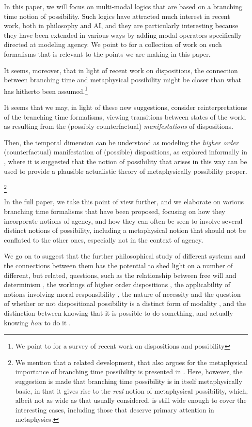\documentclass{article}
\begin{document}
In this paper, we will focus on multi-modal logics that are based on a branching time notion of possibility. Such logics have attracted much interest in recent work, both in philosophy and AI, and they are particularly interesting because they have been extended in various ways by adding modal operators specifically directed at modeling agency. We point to \cite{stit,dstit,atl,atle,nctl,stitstart} for a collection of work on such formalisms that is relevant to the points we are making in this paper.

It seems, moreover, that in light of recent work on dispositions, the connection between branching time and metaphysical possibility might be closer than what has hitherto been assumed.\footnote{We point to \cite{MwPw} for a survey of recent work on dispositions and possibility} 

It seems that we may, in light of these new suggestions, consider reinterpretations of the branching time formalisms, viewing transitions between states of the world as resulting from the (possibly counterfactual) \emph{manifestations} of dispositions. 

Then, the temporal dimension can be understood as modeling the \emph{higher order} (counterfactual) manifestation of (possible) dispositions, as explored informally in \cite{dispmod}, where it is suggested that the notion of possibility that arises in this way can be used to provide a plausible actualistic theory of metaphysically possibility proper.

\footnote{We mention that a related development, that also argues for the metaphysical importance of branching time possibility is presented in \cite{realmod}. Here, however, the suggestion is made that branching time possibility is in itself metaphysically basic, in that it gives rise to the \emph{real} notion of metaphysical possibility, which, albeit not as wide as that usually considered, is still wide enough to cover the interesting cases, including those that deserve primary attention in metaphysics.}

In the full paper, we take this point of view further, and we elaborate on various branching time formalisms that have been proposed, focusing on how they incorporate notions of agency, and how they can often be seen to involve several distinct notions of possibility, including a metaphysical notion that should not be conflated to the other ones, especially not in the context of agency.

We go on to suggest that the further philosophical study of different systems and the connections between them has the potential to shed light on a number of different, but related, questions, such as the relationship between free will and determinism \cite{Listfree,strawsonfree}, the workings of higher order dispositions \cite{dispmod}, the applicability of notions involving moral responsibility \cite{frankfurt,mensrea}, the nature of necessity and the question of whether or not dispositional possibility is a distinct form of modality \cite{DM,EaM,Los}, and the distinction between knowing that it is possible to do something, and actually knowing \emph{how} to do it \cite{atlhow,atlhowto}.
\end{document}
